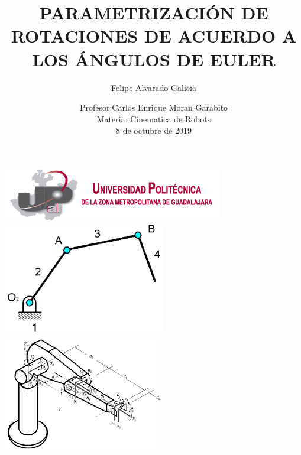 \documentclass[12pt,a4paper]{article}
\author{Felipe Alvarado Galicia}
\title{PARAMETRIZACIÓN DE ROTACIONES DE ACUERDO A LOS ÁNGULOS DE EULER}
\date{Profesor:Carlos Enrique Moran Garabito\\
Materia: Cinematica de Robots\\
8 de octubre de 2019}
\begin{document}
\maketitle
 \includegraphics[scale=1]{logo1.png}\\
\includegraphics[scale=1]{imag5.png} 
\includegraphics[scale=1]{imag8.png}\\\\\\\\\\\\\\\\\\\\\\\\\\\\\\\\\\\\\\\\\\\\\\
\end{document}

